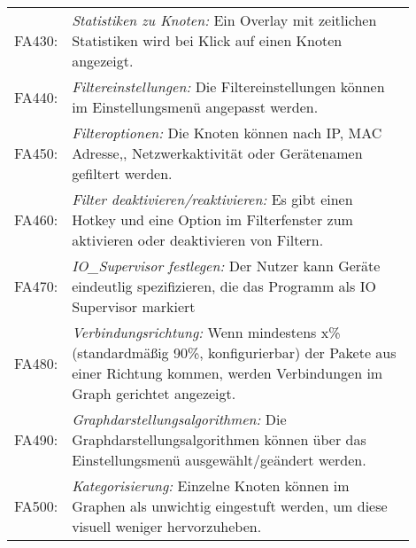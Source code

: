 \begin{tabular}{lp{0.9\linewidth}}

FA430: & \textit{Statistiken zu Knoten: }Ein Overlay mit zeitlichen Statistiken wird bei Klick auf einen Knoten angezeigt. \\

FA440: & \textit{Filtereinstellungen: }Die Filtereinstellungen können im Einstellungsmenü angepasst werden. \\

FA450: & \textit{Filteroptionen: }Die Knoten können nach IP, MAC Adresse,, Netzwerkaktivität oder Gerätenamen gefiltert werden. \\

FA460: & \textit{Filter deaktivieren/reaktivieren: }Es gibt einen Hotkey und eine Option im Filterfenster zum aktivieren oder deaktivieren von Filtern. \\

FA470: & \textit{IO\_Supervisor festlegen: }Der Nutzer kann Geräte eindeutlig spezifizieren, die das Programm als IO Supervisor markiert \\ %

FA480: & \textit{Verbindungsrichtung: }Wenn mindestens x\% (standardmäßig 90\%, konfigurierbar) der Pakete aus einer Richtung kommen, werden Verbindungen im Graph gerichtet angezeigt. \\

FA490: & \textit{Graphdarstellungsalgorithmen: }Die Graphdarstellungsalgorithmen können über das Einstellungsmenü ausgewählt/geändert werden. \\

FA500: & \textit{Kategorisierung: }Einzelne Knoten können im Graphen als unwichtig eingestuft werden, um diese visuell weniger hervorzuheben. \\
\end{tabular}